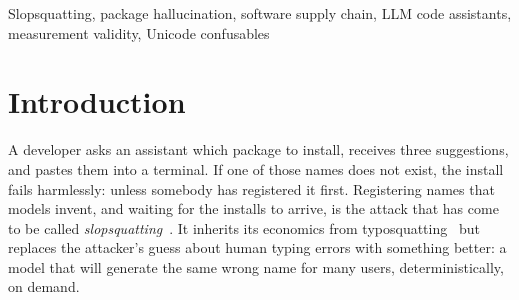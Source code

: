\documentclass[journal]{IEEEtran}
\providecommand{\citep}[1]{\cite{#1}}
\theoremstyle{definition}
\newcommand{\Nprompts}{120}
\newcommand{\Npkg}{353}
\newcommand{\Nhall}{2}
\newcommand{\Rate}{0.57}
\newcommand{\Ratelo}{0.16}
\newcommand{\Ratehi}{2.04}
\newcommand{\Ruleofthree}{0.85}
\newcommand{\Model}{openai/\allowbreak{}gpt-\allowbreak{}oss-\allowbreak{}20b}
\newcommand{\Ntrunc}{3}
\newcommand{\Ndashchar}{3}
\newcommand{\UPromptrate}{1.67}
\newcommand{\URatio}{2.9}
\begin{document}
\begin{abstract}
When a code-generating model invents a package name, whoever registers that
name owns every machine that runs the suggestion. The exposure is real but
small, and small quantities are the ones a sloppy pipeline gets wrong. We
measure the rate for one model, and show how easily the measurement
manufactures the number.

We issued \Nprompts{} package-recommendation prompts to \texttt{\Model} under
deterministic decoding, extracted \Npkg{} package names, and checked each
against the live PyPI registry. \Nhall{} do not exist: \Rate\%, 95\% Wilson
interval [\Ratelo\%, \Ratehi\%]. Had the count been zero, the rule-of-three
bound would still have been \Ruleofthree\%, so the measurement is only just
able to distinguish the effect from nothing.

The methodological finding matters more. One answer contained \Ndashchar{}
occurrences of U+2011, a non-breaking hyphen that renders identically to ASCII.
The extraction pattern silently truncated \Ntrunc{} names at that character:
\texttt{pandas-profiling} became \texttt{pandas}. The published total survived
only because every truncated fragment carried the same registry verdict; two
different outcomes would have doubled the reported rate.

Two further choices move the headline as much as the model does. The same
\Nhall{} events give \Rate\% per recommended name and \UPromptrate\% per
answer, a factor of \URatio, and a bootstrap over answers rather than names
admits zero into the interval. Both invented names occur exactly once, so an
attacker who pre-registered both would have intercepted \Rate\% of
recommendations and no more.
\end{abstract}

\begin{IEEEkeywords}
Slopsquatting, package hallucination, software supply chain, LLM code assistants, measurement validity, Unicode confusables
\end{IEEEkeywords}

\section{Introduction}
\label{sec:intro}

A developer asks an assistant which package to install, receives three
suggestions, and pastes them into a terminal. If one of those names does not
exist, the install fails harmlessly: unless somebody has registered it
first. Registering names that models invent, and waiting for the installs to
arrive, is the attack that has come to be called
\emph{slopsquatting}~\citep{spracklen2025packages}. It inherits its economics
from typosquatting~\citep{vu2020typosquatting, taylor2020spellbound} but
replaces the attacker's guess about human typing errors with something better:
a model that will generate the same wrong name for many users, deterministically,
on demand.
\end{document}
